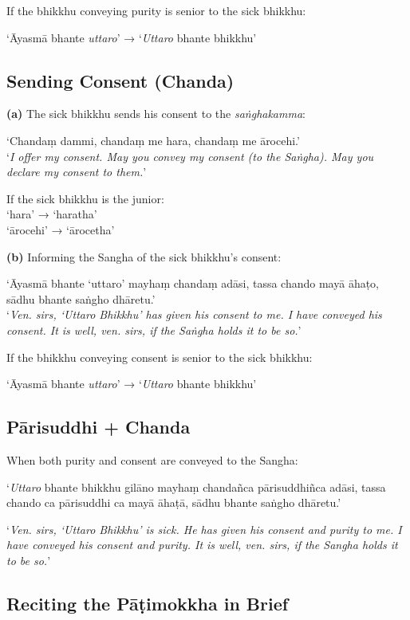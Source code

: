 If the bhikkhu conveying purity is senior to the sick bhikkhu:

‘Āyasmā bhante \emph{uttaro}’ → ‘\emph{Uttaro} bhante bhikkhu’

\subsection{Sending Consent (Chanda)}

\textbf{(a)} The sick bhikkhu sends his consent to the \emph{saṅghakamma}:

‘Chandaṃ dammi, chandaṃ me hara, chandaṃ me ārocehi.’\\
‘\emph{I offer my consent. May you convey my consent (to the Saṅgha). May you
  declare my consent to them.}’

If the sick bhikkhu is the junior:\\
‘hara’ → ‘haratha’\\
‘ārocehi’ → ‘ārocetha’

\ifhandbookedition
\clearpage
\fi

\textbf{(b)} Informing the Sangha of the sick bhikkhu's consent:

‘Āyasmā bhante ‘uttaro’ mayhaṃ chandaṃ adāsi, tassa chando mayā āhaṭo, sādhu bhante saṅgho dhāretu.’\\
‘\emph{Ven. sirs, ‘Uttaro Bhikkhu’ has given his consent to me. I have conveyed
  his consent. It is well, ven. sirs, if the Saṅgha holds it to be so.}’

If the bhikkhu conveying consent is senior to the sick bhikkhu:

‘Āyasmā bhante \emph{uttaro}’ → ‘\emph{Uttaro} bhante bhikkhu’

\subsection{Pārisuddhi + Chanda}

When both purity and consent are conveyed to the Sangha:

‘\emph{Uttaro} bhante bhikkhu gilāno mayhaṃ chandañca pārisuddhiñca adāsi, tassa
chando ca pārisuddhi ca mayā āhaṭā, sādhu bhante saṅgho dhāretu.’

‘\emph{Ven. sirs, ‘Uttaro Bhikkhu’ is sick. He has given his consent and purity
  to me. I have conveyed his consent and purity. It is well, ven. sirs, if the
  Sangha holds it to be so.}’

\clearpage

\subsection{Reciting the Pāṭimokkha in Brief}

